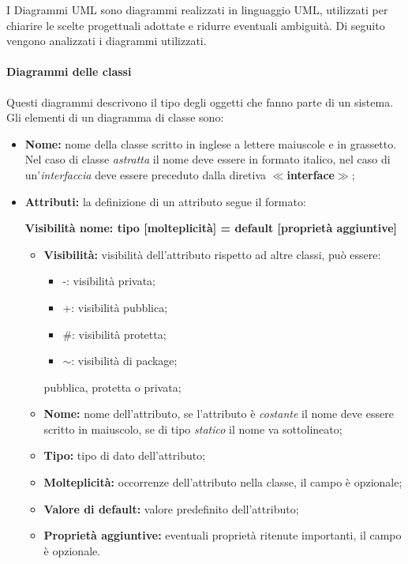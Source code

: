 \label{DiagrammiUML}
 I Diagrammi UML sono diagrammi realizzati in linguaggio UML, utilizzati per chiarire le scelte progettuali adottate e ridurre eventuali ambiguità. 
Di seguito vengono analizzati i diagrammi utilizzati.
\paragraph*{Diagrammi delle classi}
Questi diagrammi descrivono il tipo degli oggetti che fanno parte di un sistema. \\
Gli elementi di un diagramma di classe sono:
\begin{itemize}
	\item \textbf{Nome:} nome della classe scritto in inglese a lettere maiuscole e in grassetto. Nel caso di classe \textit{astratta} il nome deve essere in formato italico, nel caso di un'\textit{interfaccia} deve essere preceduto dalla diretiva \textbf{$\ll$interface$\gg$};
	\item \textbf{Attributi:} la definizione di un attributo segue il formato:
	\begin{center}
		\textbf{Visibilità nome: tipo [molteplicità] = default [proprietà aggiuntive]}
	\end{center}
	\begin{itemize}
		\item \textbf{Visibilità:} visibilità dell'attributo rispetto ad altre classi, può essere:
		\begin{itemize}
			\item -: visibilità privata;
			\item +: visibilità pubblica;
			\item \#: visibilità protetta;
			\item $\sim$: visibilità di package;
		\end{itemize} pubblica, protetta o privata;
		\item \textbf{Nome:} nome dell'attributo, se l'attributo è \textit{costante} il nome deve essere scritto in maiuscolo, se di tipo \textit{statico} il nome va sottolineato;
		\item \textbf{Tipo:} tipo di dato dell'attributo;
		\item \textbf{Molteplicità:} occorrenze dell'attributo nella classe, il campo è opzionale;
		\item \textbf{Valore di default:} valore predefinito dell'attributo;
		\item \textbf{Proprietà aggiuntive:} eventuali proprietà ritenute importanti, il campo è opzionale.

\end{itemize}
\end{itemize}
